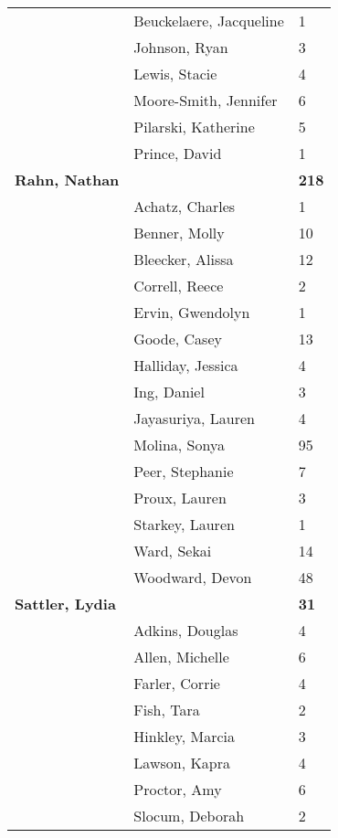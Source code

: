 \documentclass{article}\usepackage[]{graphicx}\usepackage[]{color}
\begin{document}
{\begin{longtable} { >{\raggedright}p{}|p{}p{}}
   \rowcolor[gray]{0.90} & Beuckelaere, Jacqueline & 1 \\ 
   \rowcolor[gray]{0.90} & Johnson, Ryan & 3 \\ 
   & Lewis, Stacie & 4 \\ 
   & Moore-Smith, Jennifer & 6 \\ 
   & Pilarski, Katherine & 5 \\ 
   \rowcolor[gray]{0.90} & Prince, David & 1 \\ 
   \rowcolor[gray]{0.90}\textbf{Rahn, Nathan} &  & \hspace{2cm}\textbf{218} \\ 
   \rowcolor[gray]{0.90} & Achatz, Charles & 1 \\ 
   & Benner, Molly & 10 \\ 
   & Bleecker, Alissa & 12 \\ 
   & Correll, Reece & 2 \\ 
   \rowcolor[gray]{0.90} & Ervin, Gwendolyn & 1 \\ 
   \rowcolor[gray]{0.90} & Goode, Casey & 13 \\ 
   \rowcolor[gray]{0.90} & Halliday, Jessica & 4 \\ 
   & Ing, Daniel & 3 \\ 
   & Jayasuriya, Lauren & 4 \\ 
   & Molina, Sonya & 95 \\ 
   \rowcolor[gray]{0.90} & Peer, Stephanie & 7 \\ 
   \rowcolor[gray]{0.90} & Proux, Lauren & 3 \\ 
   \rowcolor[gray]{0.90} & Starkey, Lauren & 1 \\ 
   & Ward, Sekai & 14 \\ 
   & Woodward, Devon & 48 \\ 
  \textbf{Sattler, Lydia} &  & \hspace{2cm}\textbf{31} \\ 
   \rowcolor[gray]{0.90} & Adkins, Douglas & 4 \\ 
   \rowcolor[gray]{0.90} & Allen, Michelle & 6 \\ 
   \rowcolor[gray]{0.90} & Farler, Corrie & 4 \\ 
   & Fish, Tara & 2 \\ 
   & Hinkley, Marcia & 3 \\ 
   & Lawson, Kapra & 4 \\ 
   \rowcolor[gray]{0.90} & Proctor, Amy & 6 \\ 
   \rowcolor[gray]{0.90} & Slocum, Deborah & 2 \\ 

\end{longtable}}
\end{document}

